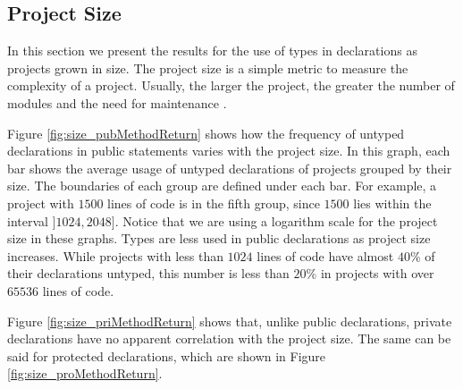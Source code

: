 \documentclass[preprint]{sigplanconf}
\begin{document}
\subsection{Project Size\label{res-size}}
In this section we present the results for the use of types in declarations as projects grown in size.
The project size is a simple metric to measure the complexity of a project.
Usually, the larger the project, the greater the number of modules and the need for maintenance \cite{Fenton1998}. 

Figure \ref{fig:size_pubMethodReturn} shows how the frequency of untyped declarations in public statements varies with the project size.
In this graph, each bar shows the average usage of untyped declarations of projects grouped by their size.
The boundaries of each group are defined under each bar.
For example, a project with $1500$ lines of code is in the fifth group, since $1500$ lies within the interval $]1024, 2048]$.
Notice that we are using a logarithm scale for the project size in these graphs.
Types are less used in public declarations as project size increases.
While projects with less than $1024$ lines of code have almost $40\%$ of their declarations untyped, this number is  less than $20\%$ in projects with over $65536$ lines of code. 

Figure \ref{fig:size_priMethodReturn} shows that, unlike public declarations, private declarations have no apparent correlation with the project size. 
The same can be said for protected declarations, which are shown in Figure \ref{fig:size_proMethodReturn}.
\end{document}
